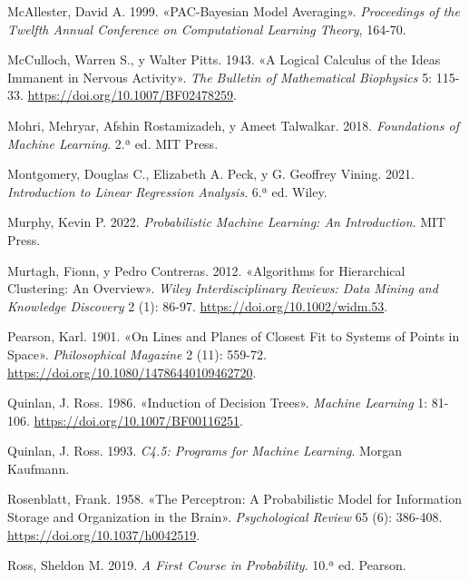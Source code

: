 \documentclass[
  spanish,
  10.5pt,
  letterpaper,
  DIV=11,
  numbers=noendperiod,
  oneside,
  open=any]{scrreprt}
\newlength{\cslhangindent}
\newenvironment{CSLReferences}[2] %
 {\begin{list}{}{%
  \setlength{\itemindent}{0pt}
  \setlength{\leftmargin}{0pt}
  \setlength{\parsep}{0pt}
  \ifodd #1
   \setlength{\leftmargin}{\cslhangindent}
   \setlength{\itemindent}{-1\cslhangindent}
  \fi
  \setlength{\itemsep}{#2\baselineskip}}}
 {\end{list}}
\theoremstyle{definition}
\theoremstyle{definition}
\theoremstyle{plain}
\theoremstyle{remark}
\begin{document}
\begin{CSLReferences}{1}{1}
McAllester, David A. 1999. {«PAC-Bayesian Model Averaging»}.
\emph{Proceedings of the Twelfth Annual Conference on Computational
Learning Theory}, 164-70.

McCulloch, Warren S., y Walter Pitts. 1943. {«A Logical Calculus of the
Ideas Immanent in Nervous Activity»}. \emph{The Bulletin of Mathematical
Biophysics} 5: 115-33. \url{https://doi.org/10.1007/BF02478259}.

Mohri, Mehryar, Afshin Rostamizadeh, y Ameet Talwalkar. 2018.
\emph{Foundations of Machine Learning}. 2.ª ed. MIT Press.

Montgomery, Douglas C., Elizabeth A. Peck, y G. Geoffrey Vining. 2021.
\emph{Introduction to Linear Regression Analysis}. 6.ª ed. Wiley.

Murphy, Kevin P. 2022. \emph{Probabilistic Machine Learning: An
Introduction}. MIT Press.

Murtagh, Fionn, y Pedro Contreras. 2012. {«Algorithms for Hierarchical
Clustering: An Overview»}. \emph{Wiley Interdisciplinary Reviews: Data
Mining and Knowledge Discovery} 2 (1): 86-97.
\url{https://doi.org/10.1002/widm.53}.

Pearson, Karl. 1901. {«On Lines and Planes of Closest Fit to Systems of
Points in Space»}. \emph{Philosophical Magazine} 2 (11): 559-72.
\url{https://doi.org/10.1080/14786440109462720}.

Quinlan, J. Ross. 1986. {«Induction of Decision Trees»}. \emph{Machine
Learning} 1: 81-106. \url{https://doi.org/10.1007/BF00116251}.

Quinlan, J. Ross. 1993. \emph{C4.5: Programs for Machine Learning}.
Morgan Kaufmann.

Rosenblatt, Frank. 1958. {«The Perceptron: A Probabilistic Model for
Information Storage and Organization in the Brain»}. \emph{Psychological
Review} 65 (6): 386-408. \url{https://doi.org/10.1037/h0042519}.

Ross, Sheldon M. 2019. \emph{A First Course in Probability}. 10.ª ed.
Pearson.


\end{CSLReferences}
\end{document}
